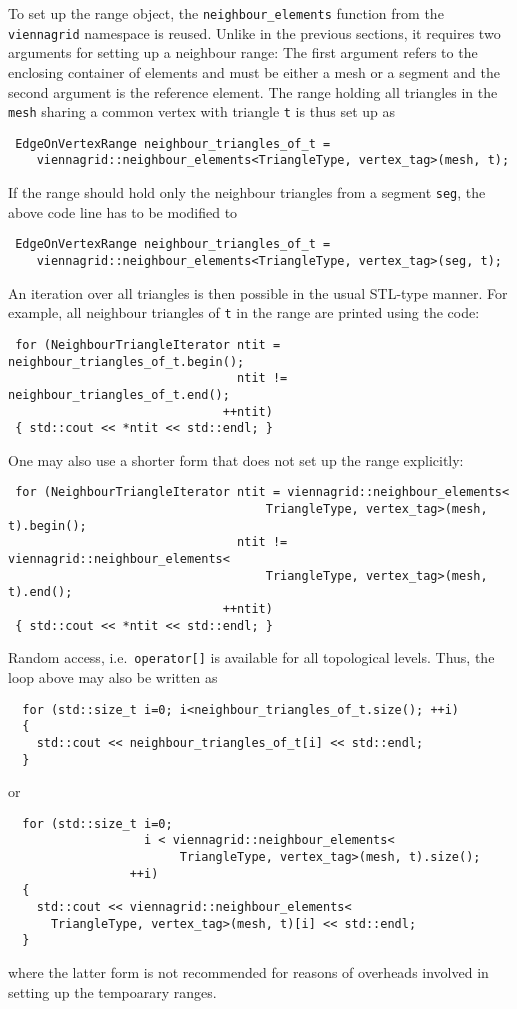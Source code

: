 To set up the range object, the \lstinline|neighbour_elements| function from the \lstinline|viennagrid| namespace is reused. Unlike in the previous sections, it requires two arguments
for setting up a neighbour range: The first argument refers to the enclosing container of elements and must be either a mesh or a segment and the second argument is the reference element.
The range holding all triangles in the \lstinline|mesh| sharing a common vertex with triangle \lstinline|t| is thus set up as
\begin{lstlisting}
 EdgeOnVertexRange neighbour_triangles_of_t =
    viennagrid::neighbour_elements<TriangleType, vertex_tag>(mesh, t);
\end{lstlisting}
If the range should hold only the neighbour triangles from a segment \lstinline|seg|, the above code line has to be modified to
\begin{lstlisting}
 EdgeOnVertexRange neighbour_triangles_of_t =
    viennagrid::neighbour_elements<TriangleType, vertex_tag>(seg, t);
\end{lstlisting}
An iteration over all triangles is then possible in the usual STL-type manner. For example, all neighbour triangles of \lstinline|t| in the range are printed using the code:
\begin{lstlisting}
 for (NeighbourTriangleIterator ntit = neighbour_triangles_of_t.begin();
                                ntit != neighbour_triangles_of_t.end();
                              ++ntit)
 { std::cout << *ntit << std::endl; }
\end{lstlisting}

\pagebreak

One may also use a shorter form that does not set up the range explicitly:
\begin{lstlisting}
 for (NeighbourTriangleIterator ntit = viennagrid::neighbour_elements<
                                    TriangleType, vertex_tag>(mesh, t).begin();
                                ntit != viennagrid::neighbour_elements<
                                    TriangleType, vertex_tag>(mesh, t).end();
                              ++ntit)
 { std::cout << *ntit << std::endl; }
\end{lstlisting}

Random access, i.e.~\lstinline|operator[]| is available for all topological levels. Thus, the loop above may also be written as
\begin{lstlisting}
  for (std::size_t i=0; i<neighbour_triangles_of_t.size(); ++i)
  {
    std::cout << neighbour_triangles_of_t[i] << std::endl;
  }
\end{lstlisting}
or 
\begin{lstlisting}
  for (std::size_t i=0;
                   i < viennagrid::neighbour_elements<
                        TriangleType, vertex_tag>(mesh, t).size();
                 ++i)
  {
    std::cout << viennagrid::neighbour_elements<
      TriangleType, vertex_tag>(mesh, t)[i] << std::endl;
  }
\end{lstlisting}
where the latter form is not recommended for reasons of overheads involved in setting up the tempoarary ranges.
